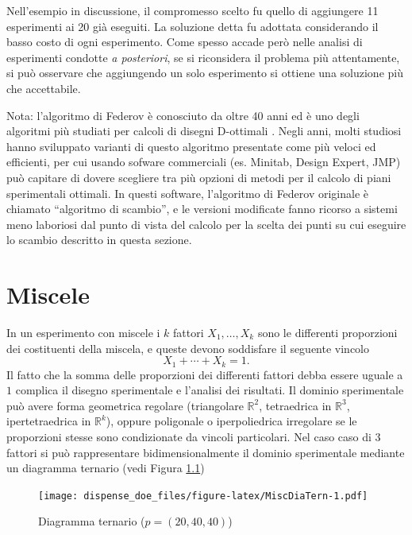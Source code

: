\documentclass[
  11pt,
]{book}
\begin{document}
Nell'esempio in discussione, il compromesso scelto fu quello di aggiungere 11 esperimenti ai 20 già eseguiti. La soluzione detta fu adottata considerando il basso costo di ogni esperimento. Come spesso accade però nelle analisi di esperimenti condotte \emph{a posteriori}, se si riconsidera il problema più attentamente, si può osservare che aggiungendo un solo esperimento si ottiene una soluzione più che accettabile.

Nota: l'algoritmo di Federov è conosciuto da oltre 40 anni ed è uno degli algoritmi più studiati per calcoli di disegni D-ottimali \citep{v.v.federov1972}. Negli anni, molti studiosi hanno sviluppato varianti di questo algoritmo presentate come più veloci ed efficienti, per cui usando sofware commerciali (es. Minitab, Design Expert, JMP) può capitare di dovere scegliere tra più opzioni di metodi per il calcolo di piani sperimentali ottimali. In questi software, l'algoritmo di Federov originale è chiamato ``algoritmo di scambio'', e le versioni modificate fanno ricorso a sistemi meno laboriosi dal punto di vista del calcolo per la scelta dei punti su cui eseguire lo scambio descritto in questa sezione.

\hypertarget{miscele}{%
\chapter{Miscele}\label{miscele}}

In un esperimento con miscele i \(k\) fattori \(X_1, \dots, X_k\) sono le differenti proporzioni dei costituenti della miscela, e queste devono soddisfare il seguente vincolo
\begin{equation}
    X_1+\cdots+X_k=1.
    \label{eq:VinMisc}
 \end{equation}
Il fatto che la somma delle proporzioni dei differenti fattori debba essere uguale a \(1\) complica il disegno sperimentale e l'analisi dei risultati. Il dominio sperimentale può avere forma geometrica regolare (triangolare \(\mathbb{R}^2\), tetraedrica in \(\mathbb{R}^3\), ipertetraedrica in \(\mathbb{R}^k\)), oppure poligonale o iperpoliedrica irregolare se le proporzioni stesse sono condizionate da vincoli particolari.
Nel caso caso di \(3\) fattori si può rappresentare bidimensionalmente il dominio sperimentale mediante un diagramma ternario (vedi Figura \ref{fig:MiscDiaTern})

\begin{figure}
\centering
\texttt{[image: dispense\_doe\_files/figure-latex/MiscDiaTern-1.pdf]}
\caption{\label{fig:MiscDiaTern}Diagramma ternario (\(p=(20,40,40)\))}
\end{figure}
\end{document}
